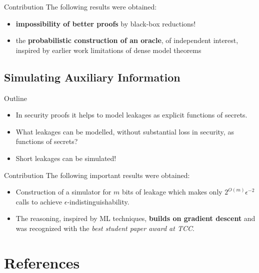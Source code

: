 \documentclass[10pt]{beamer}					%
\begin{document}
\begin{frame}{Contribution}
The following results were obtained:
\begin{itemize}
    \item[\emoji{key}] \textbf{impossibility of better proofs} by black-box reductions!
    \item[\emoji{key}] the \textbf{probabilistic construction of an oracle}, of independent interest, inspired by earlier work limitations of dense model theorems~\cite{DBLP:journals/eccc/Zhang11}
\end{itemize}
\end{frame}

\subsection{Simulating Auxiliary Information }

\begin{frame}{Outline}
\begin{itemize}
\item[\emoji{open-book}] In security proofs it helps to model leakages as explicit functions of secrets.
\item[\emoji{question}] What leakages can be modelled, without substantial loss in security, as functions of secrets?
\item[\emoji{raised-hand}] Short leakages can be simulated!
\end{itemize}
\end{frame}

\begin{frame}{Contribution}
The following important results were obtained:
\begin{itemize}
\item[\emoji{key}] Construction of a simulator for $m$ bits of leakage which makes only $2^{O(m)}\epsilon^{-2}$ calls to achieve $\epsilon$-indistinguishability.
\item[\emoji{trophy}] The reasoning, inspired by ML techniques, \textbf{builds on gradient descent} and was recognized with the \emph{best student paper award at TCC}.
\end{itemize}
\end{frame}



%

\section{References }
\end{document}
